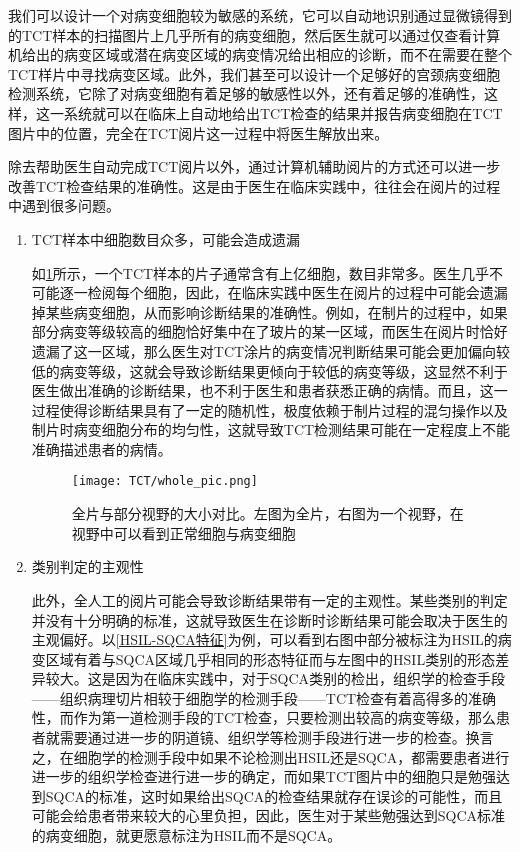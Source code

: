\par 我们可以设计一个对病变细胞较为敏感的系统，它可以自动地识别通过显微镜得到的TCT样本的扫描图片上几乎所有的病变细胞，然后医生就可以通过仅查看计算机给出的病变区域或潜在病变区域的病变情况给出相应的诊断，而不在需要在整个TCT样片中寻找病变区域。此外，我们甚至可以设计一个足够好的宫颈病变细胞检测系统，它除了对病变细胞有着足够的敏感性以外，还有着足够的准确性，这样，这一系统就可以在临床上自动地给出TCT检查的结果并报告病变细胞在TCT图片中的位置，完全在TCT阅片这一过程中将医生解放出来。
\par 除去帮助医生自动完成TCT阅片以外，通过计算机辅助阅片的方式还可以进一步改善TCT检查结果的准确性。这是由于医生在临床实践中，往往会在阅片的过程中遇到很多问题。

\begin{enumerate}
    \item TCT样本中细胞数目众多，可能会造成遗漏
          \par 如\ref{TCT全片}所示，一个TCT样本的片子通常含有上亿细胞，数目非常多。医生几乎不可能逐一检阅每个细胞，因此，在临床实践中医生在阅片的过程中可能会遗漏掉某些病变细胞，从而影响诊断结果的准确性。例如，在制片的过程中，如果部分病变等级较高的细胞恰好集中在了玻片的某一区域，而医生在阅片时恰好遗漏了这一区域，那么医生对TCT涂片的病变情况判断结果可能会更加偏向较低的病变等级，这就会导致诊断结果更倾向于较低的病变等级，这显然不利于医生做出准确的诊断结果，也不利于医生和患者获悉正确的病情。而且，这一过程使得诊断结果具有了一定的随机性，极度依赖于制片过程的混匀操作以及制片时病变细胞分布的均匀性，这就导致TCT检测结果可能在一定程度上不能准确描述患者的病情。

          \begin{figure}[h]
              \centering
              \texttt{[image: TCT/whole\_pic.png]}
              \caption{全片与部分视野的大小对比。左图为全片，右图为一个视野，在视野中可以看到正常细胞与病变细胞}
              \label{TCT全片}
          \end{figure}
    \item 类别判定的主观性
    \label{par:类别判定的主观性}
          \par 此外，全人工的阅片可能会导致诊断结果带有一定的主观性。某些类别的判定并没有十分明确的标准，这就导致医生在诊断时诊断结果可能会取决于医生的主观偏好。以\ref{HSIL-SQCA特征}为例，可以看到右图中部分被标注为HSIL的病变区域有着与SQCA区域几乎相同的形态特征而与左图中的HSIL类别的形态差异较大。这是因为在临床实践中，对于SQCA类别的检出，组织学的检查手段——组织病理切片相较于细胞学的检测手段——TCT检查有着高得多的准确性，而作为第一道检测手段的TCT检查，只要检测出较高的病变等级，那么患者就需要通过进一步的阴道镜、组织学等检测手段进行进一步的检查。换言之，在细胞学的检测手段中如果不论检测出HSIL还是SQCA，都需要患者进行进一步的组织学检查进行进一步的确定，而如果TCT图片中的细胞只是勉强达到SQCA的标准，这时如果给出SQCA的检查结果就存在误诊的可能性，而且可能会给患者带来较大的心里负担，因此，医生对于某些勉强达到SQCA标准的病变细胞，就更愿意标注为HSIL而不是SQCA。


\end{enumerate}
